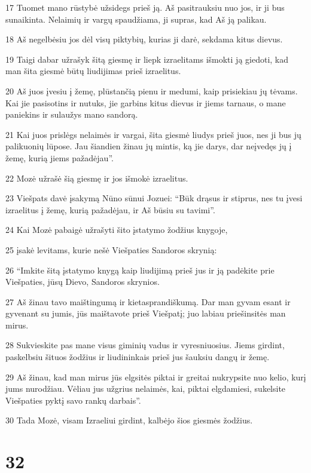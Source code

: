 \par 17 Tuomet mano rūstybė užsidegs prieš ją. Aš pasitrauksiu nuo jos, ir ji bus sunaikinta. Nelaimių ir vargų spaudžiama, ji supras, kad Aš ją palikau. 
\par 18 Aš negelbėsiu jos dėl visų piktybių, kurias ji darė, sekdama kitus dievus. 
\par 19 Taigi dabar užrašyk šitą giesmę ir liepk izraelitams išmokti ją giedoti, kad man šita giesmė būtų liudijimas prieš izraelitus. 
\par 20 Aš juos įvesiu į žemę, plūstančią pienu ir medumi, kaip prisiekiau jų tėvams. Kai jie pasisotins ir nutuks, jie garbins kitus dievus ir jiems tarnaus, o mane paniekins ir sulaužys mano sandorą. 
\par 21 Kai juos prislėgs nelaimės ir vargai, šita giesmė liudys prieš juos, nes ji bus jų palikuonių lūpose. Jau šiandien žinau jų mintis, ką jie darys, dar neįvedęs jų į žemę, kurią jiems pažadėjau”. 
\par 22 Mozė užrašė šią giesmę ir jos išmokė izraelitus. 
\par 23 Viešpats davė įsakymą Nūno sūnui Jozuei: “Būk drąsus ir stiprus, nes tu įvesi izraelitus į žemę, kurią pažadėjau, ir Aš būsiu su tavimi”. 
\par 24 Kai Mozė pabaigė užrašyti šito įstatymo žodžius knygoje, 
\par 25 įsakė levitams, kurie nešė Viešpaties Sandoros skrynią: 
\par 26 “Imkite šitą įstatymo knygą kaip liudijimą prieš jus ir ją padėkite prie Viešpaties, jūsų Dievo, Sandoros skrynios. 
\par 27 Aš žinau tavo maištingumą ir kietasprandiškumą. Dar man gyvam esant ir gyvenant su jumis, jūs maištavote prieš Viešpatį; juo labiau priešinsitės man mirus. 
\par 28 Sukvieskite pas mane visus giminių vadus ir vyresniuosius. Jiems girdint, paskelbsiu šituos žodžius ir liudininkais prieš jus šauksiu dangų ir žemę. 
\par 29 Aš žinau, kad man mirus jūs elgsitės piktai ir greitai nukrypsite nuo kelio, kurį jums nurodžiau. Vėliau jus užgrius nelaimės, kai, piktai elgdamiesi, sukelsite Viešpaties pyktį savo rankų darbais”. 
\par 30 Tada Mozė, visam Izraeliui girdint, kalbėjo šios giesmės žodžius.



\chapter{32}

